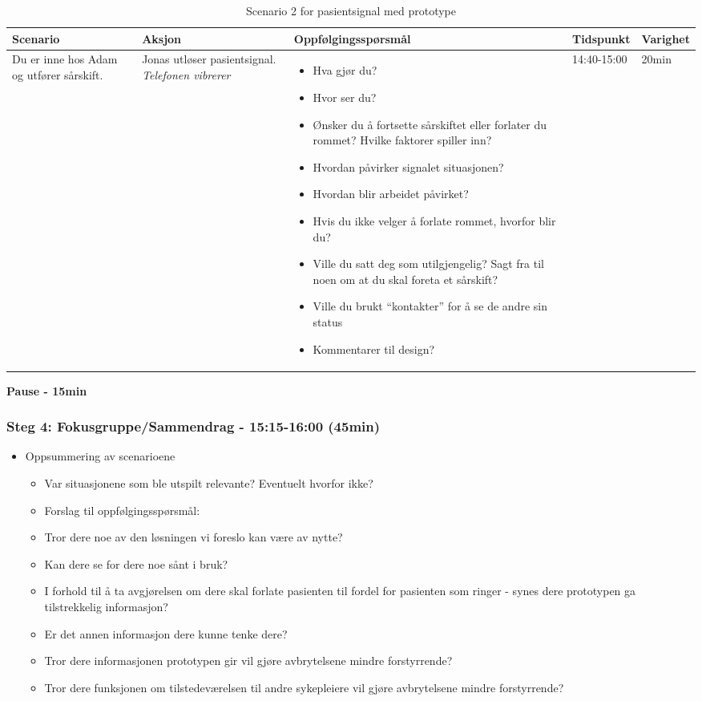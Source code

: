 \begin{table}[H]
\small
\begin{tabular}{p{3cm}|p{2cm}|p{4cm}|l|l}
\hline
\textbf{Scenario} & \textbf{Aksjon} & \textbf{Oppfølgingsspørsmål} & \textbf{Tidspunkt} & \textbf{Varighet}\\
\hline
Du er inne hos Adam og utfører sårskift. & Jonas utløser pasientsignal. \emph{Telefonen vibrerer} & \begin{itemize}
\item Hva gjør du?
\item Hvor ser du?
\item Ønsker du å fortsette sårskiftet eller forlater du rommet? Hvilke faktorer spiller inn?
\item Hvordan påvirker signalet situasjonen?
\item Hvordan blir arbeidet påvirket?
\item Hvis du ikke velger å forlate rommet, hvorfor blir du?
\item Ville du satt deg som utilgjengelig? Sagt fra til noen om at du skal foreta et sårskift?
\item Ville du brukt “kontakter” for å se de andre sin status
\item Kommentarer til design?
\end{itemize}
& 14:40-15:00 & 20min\\
\end{tabular}
\caption{Scenario 2 for pasientsignal med prototype}
\label{Steg3.4}
\end{table}

\textbf{Pause - 15min}

\pagebreak

\subsubsection{Steg 4: Fokusgruppe/Sammendrag - 15:15-16:00 (45min)}

\begin{itemize}
\item Oppsummering av scenarioene
	\begin{itemize}
	\item Var situasjonene som ble utspilt relevante? Eventuelt hvorfor ikke?
\item Forslag til oppfølgingsspørsmål:
	\item Tror dere noe av den løsningen vi foreslo kan være av nytte?
	\item Kan dere se for dere noe sånt i bruk?
	\item I forhold til å ta avgjørelsen om dere skal forlate pasienten til fordel for pasienten som ringer - synes dere prototypen ga tilstrekkelig informasjon?
		\item Er det annen informasjon dere kunne tenke dere?
	\item Tror dere informasjonen prototypen gir vil gjøre avbrytelsene mindre forstyrrende?
	\item Tror dere funksjonen om tilstedeværelsen til andre sykepleiere vil gjøre avbrytelsene mindre forstyrrende?
	\end{itemize}
\end{itemize}